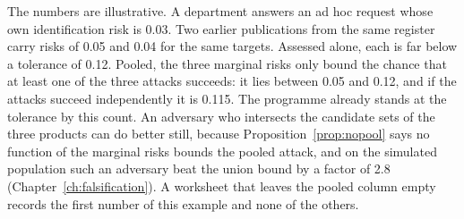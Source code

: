\begin{example}\label{c17:ex-pooled}
The numbers are illustrative. A department answers an ad hoc request whose own
identification risk is 0.03. Two earlier publications from the same register carry risks
of 0.05 and 0.04 for the same targets. Assessed alone, each is far below a tolerance of
0.12. Pooled, the three marginal risks only bound the chance that at least one of the
three attacks succeeds: it lies between 0.05 and 0.12, and if the attacks succeed
independently it is 0.115. The programme already stands at the tolerance by this count.
An adversary who intersects the candidate sets of the three products can do better still,
because Proposition~\ref{prop:nopool} says no function of the marginal risks bounds the
pooled attack, and on the simulated population such an adversary beat the union bound by
a factor of 2.8 (Chapter~\ref{ch:falsification}). A worksheet that leaves the pooled
column empty records the first number of this example and none of the others.
\end{example}


